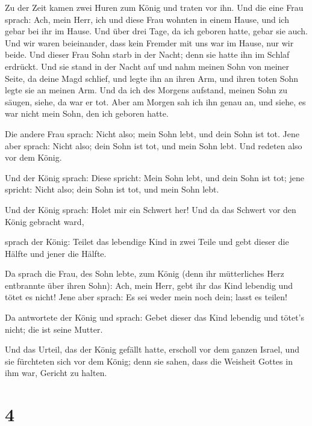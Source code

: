  Zu der Zeit kamen zwei Huren zum König und traten vor
ihn.  Und die eine Frau sprach: Ach, mein Herr, ich und
diese Frau wohnten in einem Hause, und ich gebar bei ihr im Hause.
 Und über drei Tage, da ich geboren hatte, gebar sie
auch. Und wir waren beieinander, dass kein Fremder mit uns war im Hause,
nur wir beide.  Und dieser Frau Sohn starb in der Nacht;
denn sie hatte ihn im Schlaf erdrückt.  Und sie stand in
der Nacht auf und nahm meinen Sohn von meiner Seite, da deine Magd
schlief, und legte ihn an ihren Arm, und ihren toten Sohn legte sie an
meinen Arm.  Und da ich des Morgens aufstand, meinen Sohn
zu säugen, siehe, da war er tot. Aber am Morgen sah ich ihn genau an,
und siehe, es war nicht mein Sohn, den ich geboren hatte.

 Die andere Frau sprach: Nicht also; mein Sohn lebt, und
dein Sohn ist tot. Jene aber sprach: Nicht also; dein Sohn ist tot, und
mein Sohn lebt. Und redeten also vor dem König.

 Und der König sprach: Diese spricht: Mein Sohn lebt, und
dein Sohn ist tot; jene spricht: Nicht also; dein Sohn ist tot, und mein
Sohn lebt.

 Und der König sprach: Holet mir ein Schwert her! Und da
das Schwert vor den König gebracht ward,

 sprach der König: Teilet das lebendige Kind in zwei
Teile und gebt dieser die Hälfte und jener die Hälfte.

 Da sprach die Frau, des Sohn lebte, zum König (denn ihr
mütterliches Herz entbrannte über ihren Sohn): Ach, mein Herr, gebt ihr
das Kind lebendig und tötet es nicht! Jene aber sprach: Es sei weder
mein noch dein; lasst es teilen!

 Da antwortete der König und sprach: Gebet dieser das
Kind lebendig und tötet's nicht; die ist seine Mutter.

 Und das Urteil, das der König gefällt hatte, erscholl
vor dem ganzen Israel, und sie fürchteten sich vor dem König; denn sie
sahen, dass die Weisheit Gottes in ihm war, Gericht zu halten.

\hypertarget{section-3}{%
\section{4}\label{section-3}}

